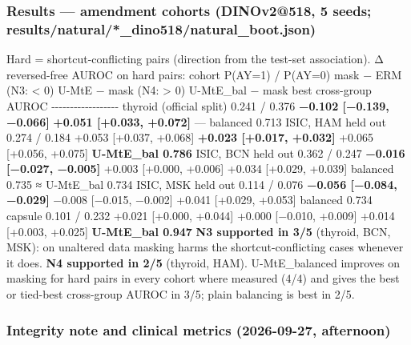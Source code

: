 {\subsubsection{Results --- amendment cohorts (DINOv2@518, 5 seeds; results/natural/*\_dino518/natural\_boot.json)}\label{results--amendment-cohorts-dinov2518-5-seeds-resultsnatural_dino518natural_bootjson}

Hard = shortcut-conflicting pairs (direction from the test-set association). Δ reversed-free AUROC on hard pairs:
\textbar{} cohort \textbar{} P(A\textbar Y=1) / P(A\textbar Y=0) \textbar{} mask − ERM (N3: \textless{} 0) \textbar{} U-MtE − mask (N4: \textgreater{} 0) \textbar{} U-MtE\_bal − mask \textbar{} best cross-group AUROC \textbar{}
\textbar-\/-\/-\textbar-\/-\/-\textbar-\/-\/-\textbar-\/-\/-\textbar-\/-\/-\textbar-\/-\/-\textbar{}
\textbar{} thyroid (official split) \textbar{} 0.241 / 0.376 \textbar{} \textbf{−0.102 {[}−0.139, −0.066{]}} \textbar{} \textbf{+0.051 {[}+0.033, +0.072{]}} \textbar{} --- \textbar{} balanced 0.713 \textbar{}
\textbar{} ISIC, HAM held out \textbar{} 0.274 / 0.184 \textbar{} +0.053 {[}+0.037, +0.068{]} \textbar{} \textbf{+0.023 {[}+0.017, +0.032{]}} \textbar{} +0.065 {[}+0.056, +0.075{]} \textbar{} \textbf{U-MtE\_bal 0.786} \textbar{}
\textbar{} ISIC, BCN held out \textbar{} 0.362 / 0.247 \textbar{} \textbf{−0.016 {[}−0.027, −0.005{]}} \textbar{} +0.003 {[}+0.000, +0.006{]} \textbar{} +0.034 {[}+0.029, +0.039{]} \textbar{} balanced 0.735 ≈ U-MtE\_bal 0.734 \textbar{}
\textbar{} ISIC, MSK held out \textbar{} 0.114 / 0.076 \textbar{} \textbf{−0.056 {[}−0.084, −0.029{]}} \textbar{} −0.008 {[}−0.015, −0.002{]} \textbar{} +0.041 {[}+0.029, +0.053{]} \textbar{} balanced 0.734 \textbar{}
\textbar{} capsule \textbar{} 0.101 / 0.232 \textbar{} +0.021 {[}+0.000, +0.044{]} \textbar{} +0.000 {[}−0.010, +0.009{]} \textbar{} +0.014 {[}+0.003, +0.025{]} \textbar{} \textbf{U-MtE\_bal 0.947} \textbar{}
\textbf{N3 supported in 3/5} (thyroid, BCN, MSK): on unaltered data masking harms the shortcut-conflicting cases whenever
it does. \textbf{N4 supported in 2/5} (thyroid, HAM). U-MtE\_balanced improves on masking for hard pairs in every cohort
where measured (4/4) and gives the best or tied-best cross-group AUROC in 3/5; plain balancing is best in 2/5.

\subsubsection{Integrity note and clinical metrics (2026-09-27, afternoon)}\label{integrity-note-and-clinical-metrics-2026-09-27-afternoon}

}
